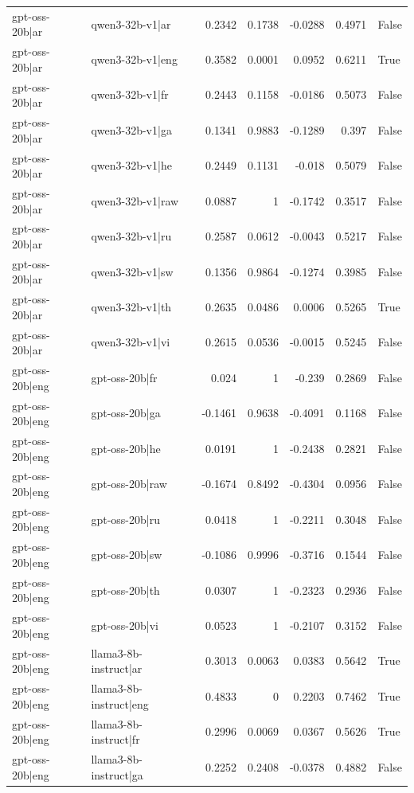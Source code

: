 \begin{table}
\begin{tabular}{l l r r r r l}
gpt-oss-20b|ar & qwen3-32b-v1|ar & 0.2342 & 0.1738 & -0.0288 & 0.4971 & False \\
gpt-oss-20b|ar & qwen3-32b-v1|eng & 0.3582 & 0.0001 & 0.0952 & 0.6211 & True \\
gpt-oss-20b|ar & qwen3-32b-v1|fr & 0.2443 & 0.1158 & -0.0186 & 0.5073 & False \\
gpt-oss-20b|ar & qwen3-32b-v1|ga & 0.1341 & 0.9883 & -0.1289 & 0.397 & False \\
gpt-oss-20b|ar & qwen3-32b-v1|he & 0.2449 & 0.1131 & -0.018 & 0.5079 & False \\
gpt-oss-20b|ar & qwen3-32b-v1|raw & 0.0887 & 1 & -0.1742 & 0.3517 & False \\
gpt-oss-20b|ar & qwen3-32b-v1|ru & 0.2587 & 0.0612 & -0.0043 & 0.5217 & False \\
gpt-oss-20b|ar & qwen3-32b-v1|sw & 0.1356 & 0.9864 & -0.1274 & 0.3985 & False \\
gpt-oss-20b|ar & qwen3-32b-v1|th & 0.2635 & 0.0486 & 0.0006 & 0.5265 & True \\
gpt-oss-20b|ar & qwen3-32b-v1|vi & 0.2615 & 0.0536 & -0.0015 & 0.5245 & False \\
gpt-oss-20b|eng & gpt-oss-20b|fr & 0.024 & 1 & -0.239 & 0.2869 & False \\
gpt-oss-20b|eng & gpt-oss-20b|ga & -0.1461 & 0.9638 & -0.4091 & 0.1168 & False \\
gpt-oss-20b|eng & gpt-oss-20b|he & 0.0191 & 1 & -0.2438 & 0.2821 & False \\
gpt-oss-20b|eng & gpt-oss-20b|raw & -0.1674 & 0.8492 & -0.4304 & 0.0956 & False \\
gpt-oss-20b|eng & gpt-oss-20b|ru & 0.0418 & 1 & -0.2211 & 0.3048 & False \\
gpt-oss-20b|eng & gpt-oss-20b|sw & -0.1086 & 0.9996 & -0.3716 & 0.1544 & False \\
gpt-oss-20b|eng & gpt-oss-20b|th & 0.0307 & 1 & -0.2323 & 0.2936 & False \\
gpt-oss-20b|eng & gpt-oss-20b|vi & 0.0523 & 1 & -0.2107 & 0.3152 & False \\
gpt-oss-20b|eng & llama3-8b-instruct|ar & 0.3013 & 0.0063 & 0.0383 & 0.5642 & True \\
gpt-oss-20b|eng & llama3-8b-instruct|eng & 0.4833 & 0 & 0.2203 & 0.7462 & True \\
gpt-oss-20b|eng & llama3-8b-instruct|fr & 0.2996 & 0.0069 & 0.0367 & 0.5626 & True \\
gpt-oss-20b|eng & llama3-8b-instruct|ga & 0.2252 & 0.2408 & -0.0378 & 0.4882 & False \\

\end{tabular}
\end{table}
